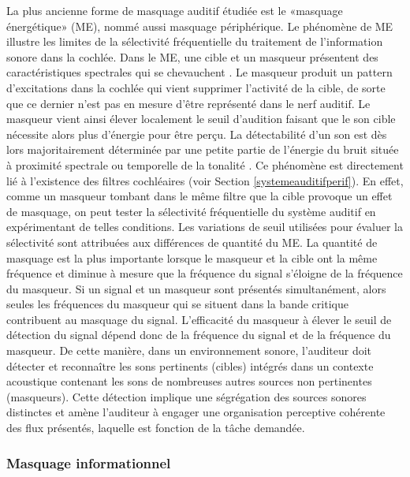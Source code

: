La plus ancienne forme de masquage auditif étudiée est le «masquage énergétique» (ME), nommé aussi masquage périphérique. 
Le phénomène de ME illustre les limites de la sélectivité fréquentielle du traitement de l’information sonore dans la cochlée. 
Dans le ME, une cible et un masqueur présentent des caractéristiques spectrales qui se chevauchent \citep{delgutte1990physiological}. 
Le masqueur produit un pattern d’excitations dans la cochlée qui vient supprimer l’activité de la cible, de sorte que ce dernier n’est pas en mesure d'être représenté dans le nerf auditif. 
Le masqueur vient ainsi élever localement le seuil d’audition faisant que le son cible nécessite alors plus d’énergie pour être perçu. 
La détectabilité d'un son est dès lors majoritairement déterminée par une petite partie de l'énergie du bruit située à proximité spectrale ou temporelle de la tonalité \citep{fletcher1940auditory, green1966signal, penner1973critical}. 
Ce phénomène est directement lié à l'existence des filtres cochléaires (voir Section \ref{systemeauditifperif}). 
En effet, comme un masqueur tombant dans le même filtre que la cible provoque un effet de masquage, on peut tester la sélectivité fréquentielle du système auditif en expérimentant de telles conditions. 
Les variations de seuil utilisées pour évaluer la sélectivité sont attribuées aux différences de quantité du ME. 
La quantité de masquage est la plus importante lorsque le masqueur et la cible ont la même fréquence et diminue à mesure que la fréquence du signal s'éloigne de la fréquence du masqueur.
Si un signal et un masqueur sont présentés simultanément, alors seules les fréquences du masqueur qui se situent dans la bande critique contribuent au masquage du signal. 
L'efficacité du masqueur à élever le seuil de détection du signal dépend donc de la fréquence du signal et de la fréquence du masqueur. 
De cette manière, dans un environnement sonore, l'auditeur doit détecter et reconnaître les sons pertinents (cibles) intégrés dans un contexte acoustique contenant les sons de nombreuses autres sources non pertinentes (masqueurs). 
Cette détection implique une ségrégation des sources sonores distinctes et amène l'auditeur à engager une organisation perceptive cohérente des flux présentés, laquelle est fonction de la tâche demandée. 

\subsubsection{Masquage informationnel}
\label{masquageinformationnel}

